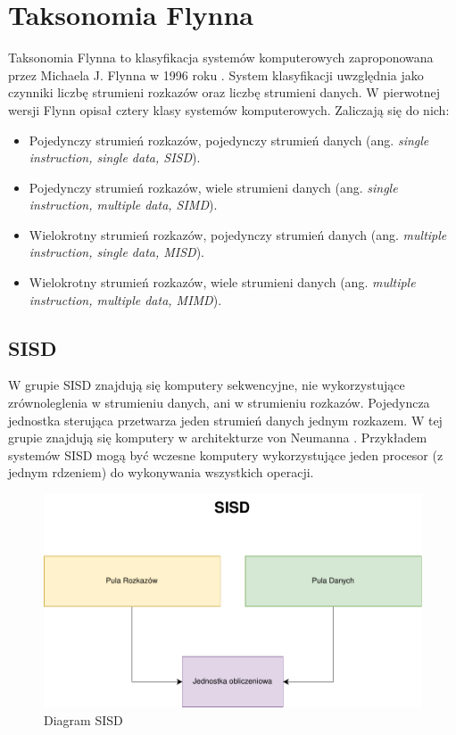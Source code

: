 \documentclass[a4paper,12pt]{book} %
\begin{document}
\section{Taksonomia Flynna}
Taksonomia Flynna to klasyfikacja systemów komputerowych zaproponowana przez Michaela J. Flynna w 1996 roku \cite{Flynn1966}. System klasyfikacji uwzględnia jako czynniki liczbę strumieni rozkazów oraz liczbę strumieni danych.
W pierwotnej wersji Flynn opisał cztery klasy systemów komputerowych. Zaliczają się do nich:
\begin{itemize}[topsep=1pt, itemsep=0.5pt]
	\item Pojedynczy strumień rozkazów, pojedynczy strumień danych (ang. \emph{single instruction, single data, SISD}).
	\item Pojedynczy strumień rozkazów, wiele strumieni danych (ang. \emph{single instruction, multiple data, SIMD}).
	\item Wielokrotny strumień rozkazów, pojedynczy strumień danych (ang. \emph{multiple instruction, single data, MISD}).
	\item Wielokrotny strumień rozkazów, wiele strumieni danych (ang. \emph{multiple instruction, multiple data, MIMD}).
\end{itemize}
\newpage

\subsection{SISD}
W grupie SISD znajdują się komputery sekwencyjne, nie wykorzystujące zrównoleglenia w strumieniu danych, ani w strumieniu rozkazów. Pojedyncza jednostka sterująca przetwarza jeden strumień danych jednym rozkazem. W tej grupie znajdują się komputery w architekturze von Neumanna \cite{Neumann}. Przykładem systemów SISD mogą być wczesne komputery wykorzystujące jeden procesor (z jednym rdzeniem) do wykonywania wszystkich operacji.
\begin{figure}[h]
	\centering
	\includegraphics[scale=0.7]{assets/SISD.pdf}
	\caption{Diagram SISD}
	\label{SISD}
\end{figure}
\end{document}
